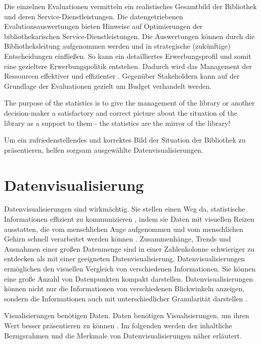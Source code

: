 Die einzelnen Evaluationen vermitteln ein realistisches Gesamtbild der Bibliothek und deren Service-Dienstleistungen. 
Die datengetriebenen Evalutionsauswertungen bieten Hinweise auf Optimierungen der bibliothekarischen Service-Dienstleistungen. 
Die Auswertungen können durch die Bibliotheksleitung aufgenommen werden und in strategische (zukünftige) Entscheidungen einfließen. 
So kann ein detailliertes Erwerbungsprofil und somit eine gezieltere Erwerbungspolitik entstehen. 
Dadurch wird das Management der Ressourcen effektiver und effizienter \cite[vgl.][297]{johnson_peggy_fundamentals_2014}.
Gegenüber Stakeholdern kann auf der Grundlage der Evaluationen gezielt um Budget verhandelt werden.
\begin{displayquote}
    The purpose of the statistics is to give the management of the library or another decision-maker 
    a satisfactory and correct picture about the situation of the library as a support to them - the statistics are the mirror of the library!
    \cite[463]{laitinen_markku_library_2013}
\end{displayquote}

Um ein zufriedenstellendes und korrektes Bild der Situation der Bibliothek zu präsentieren, helfen sorgsam ausgewählte Datenvisualisierungen.



\clearpage
\section{Datenvisualisierung}
\label{chap:two_two}
Datenvisualisierungen sind wirkmächtig. Sie stellen einen Weg da, statistische Informationen effizient zu kommunizieren \cite[vgl.][15]{Tufte01}, 
indem sie Daten mit visuellen Reizen ausstatten, die vom menschlichen Auge aufgenommen und vom menschlichen Gehirn schnell verarbeitet werden können \cite[vgl.][32]{few_now_2009}. 
Zusammenhänge, Trends und Ausnahmen einer großen Datenmenge sind in einer Zahlenkolonne schwieriger zu entdecken als mit einer geeigneten Datenvisualisierung.
Datenvisualisierungen ermöglichen den visuellen Vergleich von verschiedenen Informationen. Sie können  eine große Anzahl von Datenpunkten kompakt darstellen. 
Datenvisualisierungen können nicht nur die Informationen von verschiedenen Blickwinkeln anzeigen, sondern die Informationen auch
mit unterschiedlicher Granularität darstellen \cite[vgl.][245]{muller_business_2013}.

Visualisierungen benötigen Daten. Daten benötigen Visualisierungen, um ihren Wert besser präsentieren zu können \cite[vgl.][16]{kirk_data_2019}.
Im folgenden werden der inhaltliche Bezugsrahmen und die Merkmale von Datenvisualisierungen näher erläutert.

